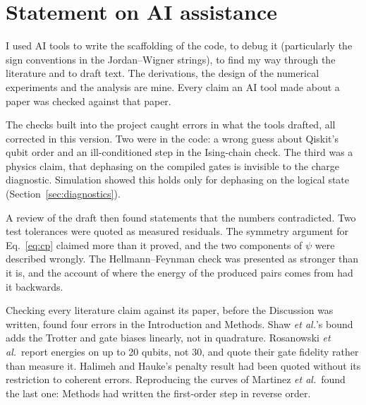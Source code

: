 \documentclass[11pt,letterpaper]{article}
\begin{document}
\section*{Statement on AI assistance}

I used AI tools to write the scaffolding of the code, to debug it
(particularly the sign conventions in the Jordan--Wigner strings), to find my
way through the literature and to draft text. The derivations, the design of
the numerical experiments and the analysis are mine. Every claim an AI tool
made about a paper was checked against that paper.

The checks built into the project caught errors in what the tools drafted, all
corrected in this version. Two were in the code: a wrong guess about Qiskit's
qubit order and an ill-conditioned step in the Ising-chain check. The third was
a physics claim, that dephasing on the compiled gates is invisible to the
charge diagnostic. Simulation showed this holds only for dephasing on the
logical state (Section~\ref{sec:diagnostics}).

A review of the draft then found statements that the numbers contradicted. Two
test tolerances were quoted as measured residuals. The symmetry argument for
Eq.~\eqref{eq:cp} claimed more than it proved, and the two components of $\psi$
were described wrongly. The Hellmann--Feynman check was presented as stronger
than it is, and the account of where the energy of the produced pairs comes
from had it backwards.

Checking every literature claim against its paper, before the Discussion was
written, found four errors in the Introduction and Methods. Shaw \emph{et al.}'s
bound adds the Trotter and gate biases linearly, not in quadrature. Rosanowski
\emph{et al.}\ report energies on up to 20 qubits, not 30, and quote their gate
fidelity rather than measure it. Halimeh and Hauke's penalty result had been
quoted without its restriction to coherent errors. Reproducing the curves of
Martinez \emph{et al.}\ found the last one: Methods had written the first-order
step in reverse order.

\clearpage


\end{document}
